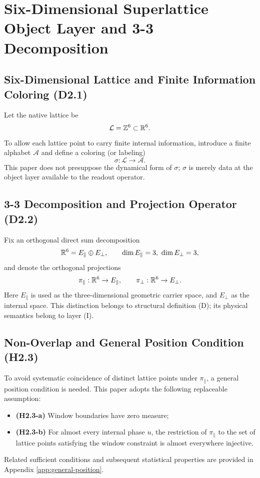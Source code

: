 \section{Six-Dimensional Superlattice Object Layer and 3-3 Decomposition}

\subsection{Six-Dimensional Lattice and Finite Information Coloring (D2.1)}

Let the native lattice be
\[
\mathcal{L}=\mathbb{Z}^{6}\subset \mathbb{R}^{6}.
\]
To allow each lattice point to carry finite internal information, introduce a finite alphabet $\mathcal{A}$ and define a coloring (or labeling)
\[
\sigma:\mathcal{L}\to \mathcal{A}.
\]
This paper does not presuppose the dynamical form of $\sigma$; $\sigma$ is merely data at the object layer available to the readout operator.

\subsection{3-3 Decomposition and Projection Operator (D2.2)}

Fix an orthogonal direct sum decomposition
\[
\mathbb{R}^{6}=E_{\parallel}\oplus E_{\perp},\qquad \dim E_{\parallel}=3,\ \dim E_{\perp}=3,
\]
and denote the orthogonal projections
\[
\pi_{\parallel}:\mathbb{R}^{6}\to E_{\parallel},\qquad
\pi_{\perp}:\mathbb{R}^{6}\to E_{\perp}.
\]
Here $E_{\parallel}$ is used as the three-dimensional geometric carrier space, and $E_{\perp}$ as the internal space. This distinction belongs to structural definition (D); its physical semantics belong to layer (I).

\subsection{Non-Overlap and General Position Condition (H2.3)}

To avoid systematic coincidence of distinct lattice points under $\pi_{\parallel}$, a general position condition is needed. This paper adopts the following replaceable assumption:
\begin{itemize}
  \item \textbf{(H2.3-a)} Window boundaries have zero measure;
  \item \textbf{(H2.3-b)} For almost every internal phase $u$, the restriction of $\pi_{\parallel}$ to the set of lattice points satisfying the window constraint is almost everywhere injective.
\end{itemize}
Related sufficient conditions and subsequent statistical properties are provided in Appendix \ref{app:general-position}.
